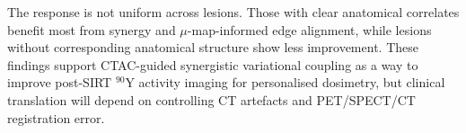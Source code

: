 The response is not uniform across lesions. Those with clear anatomical correlates benefit most from synergy and $\mu$-map-informed edge alignment, while lesions without corresponding anatomical structure show less improvement. These findings support CTAC-guided synergistic variational coupling as a way to improve post-SIRT $^{90}$Y activity imaging for personalised dosimetry, but clinical translation will depend on controlling CT artefacts and PET/SPECT/CT registration error.

